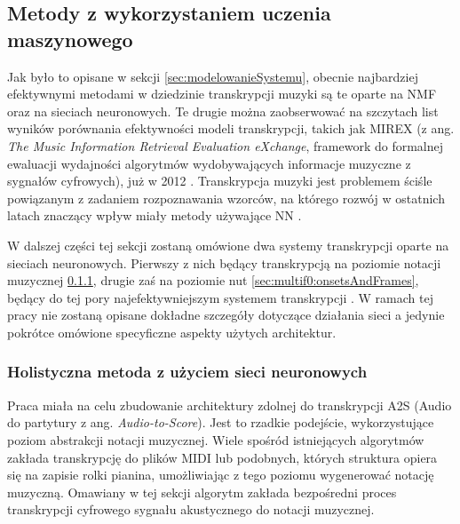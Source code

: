 \documentclass[12pt,a4paper,twoside]{mwart}
\begin{document}
\subsection{Metody z wykorzystaniem uczenia maszynowego}
Jak było to opisane w sekcji \ref{sec:modelowanieSystemu}, obecnie najbardziej efektywnymi metodami w dziedzinie transkrypcji muzyki są te oparte na NMF oraz na sieciach neuronowych. Te drugie można zaobserwować na szczytach list wyników porównania efektywności modeli transkrypcji, takich jak MIREX (z ang. \textit{The Music Information Retrieval Evaluation eXchange}, framework do formalnej ewaluacji wydajności algorytmów wydobywających informacje muzyczne z sygnałów cyfrowych), już w 2012 \cite[8-9]{Transcription:Klapuri:ChallengesAndFuture}. Transkrypcja muzyki jest problemem ściśle powiązanym z zadaniem rozpoznawania wzorców, na którego rozwój w ostatnich latach znaczący wpływ miały metody używające NN \cite[6-8]{DBLP:journals/spm/BenetosDDE19}.


W dalszej części tej sekcji zostaną omówione dwa systemy transkrypcji oparte na sieciach neuronowych. Pierwszy z nich będący transkrypcją na poziomie notacji muzycznej \ref{sec:multif0:petrusNetwork}, drugie zaś na poziomie nut \ref{sec:multif0:onsetsAndFrames}, będący do tej pory najefektywniejszym systemem transkrypcji \cite[7]{DBLP:journals/spm/BenetosDDE19}. W ramach tej pracy nie zostaną opisane dokładne szczegóły dotyczące działania sieci a jedynie pokrótce omówione specyficzne aspekty użytych architektur.

\subsubsection{Holistyczna metoda z użyciem sieci neuronowych}\label{sec:multif0:petrusNetwork}
Praca \cite{Transcription:Pertus:NeuralNetwork} miała na celu zbudowanie architektury zdolnej do transkrypcji A2S (Audio do partytury z ang. \textit{Audio-to-Score}). Jest to rzadkie podejście, wykorzystujące poziom abstrakcji notacji muzycznej. Wiele spośród istniejących algorytmów zakłada transkrypcję do plików MIDI lub podobnych, których struktura opiera się na zapisie rolki pianina, umożliwiając z tego poziomu wygenerować notację muzyczną. Omawiany w tej sekcji algorytm zakłada bezpośredni proces transkrypcji cyfrowego sygnału akustycznego do notacji muzycznej.
\end{document}
